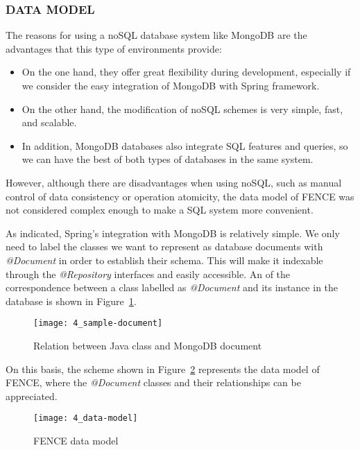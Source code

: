 \subsubsection{DATA MODEL}

The reasons for using a noSQL database system like MongoDB are the advantages that this type of environments provide:

\begin{itemize}
\item On the one hand, they offer great flexibility during development, especially if we consider the easy integration of MongoDB with Spring framework.
\item On the other hand, the modification of noSQL schemes is very simple, fast, and scalable.
\item In addition, MongoDB databases also integrate SQL features and queries, so we can have the best of both types of databases in the same system.
\end{itemize}

However, although there are disadvantages when using noSQL, such as manual control of data consistency or operation atomicity, the data model of FENCE was not considered complex enough to make a SQL system more convenient.

As indicated, Spring's integration with MongoDB is relatively simple. We only need to label the classes we want to represent as database documents with \textit{@Document} in order to establish their schema. This will make it indexable through the \textit{@Repository} interfaces and easily accessible. An  of the correspondence between a class labelled as \textit{@Document} and its instance in the database is shown in Figure~\ref{fig:doc_sample}.

\begin{figure}
	\centering
	\texttt{[image: 4\_sample-document]}
	\caption[Relation between Java class and MongoDB document]{Relation between Java class and MongoDB document}
	\label{fig:doc_sample}
\end{figure}

On this basis, the scheme shown in Figure~\ref{fig:data_model} represents the data model of FENCE, where the \textit{@Document} classes and their relationships can be appreciated.

\begin{figure}
	\centering
	\texttt{[image: 4\_data-model]}
	\caption[FENCE data model]{FENCE data model}
	\label{fig:data_model}
\end{figure}

